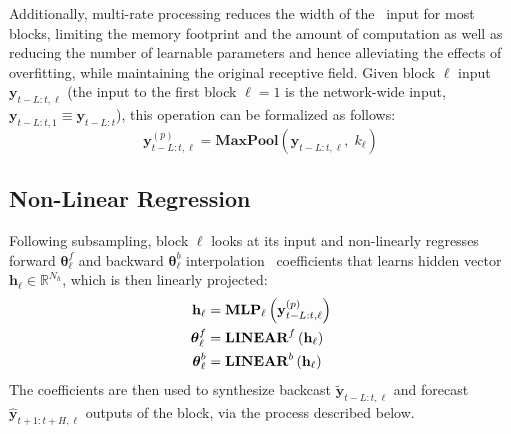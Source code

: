 
Additionally, multi-rate processing reduces the width of the \MLP\ input for most blocks, limiting the memory footprint and the amount of computation as well as  reducing the number of learnable parameters and hence alleviating the effects of overfitting, while maintaining the original receptive field. Given block $\ell$ input $\mathbf{y}_{t-L:t,\ell}$ (the input to the first block $\ell=1$ is the network-wide input, $\mathbf{y}_{t-L:t, 1} \equiv \mathbf{y}_{t-L:t}$), this operation can be formalized as follows:
\begin{equation} \label{equation:nhits_mixed_datasampling}
    \mathbf{y}^{(p)}_{t-L:t, \ell} = \mathbf{MaxPool}\left(\mathbf{y}_{t-L:t, \ell},\; k_{\ell}\right)
\end{equation}

\subsection{Non-Linear Regression}

Following subsampling, block $\ell$ looks at its input and non-linearly regresses forward $\mathbf{\theta}^{f}_{\ell}$ and backward $\mathbf{\theta}^{b}_{\ell}$ interpolation \MLP\ coefficients that learns hidden vector $\mathbf{h}_{\ell} \in \mathbb{R}^{N_{h}}$, which is then linearly projected:
\begin{align} \label{equation:nhits_projections}
\begin{split}
    \mathbf{h}_{\ell}  &= \mathbf{MLP}_{\ell}\left(\mathbf{y}^{(p)}_{t-L:t,\ell}\right) \\
    \boldsymbol \theta^{f}_{\ell} &= \textbf{LINEAR}^{f}\left(\mathbf{h}_{\ell}\right) \\
    \boldsymbol \theta^{b}_{\ell} &= \textbf{LINEAR}^{b}\left(\mathbf{h}_{\ell}\right)
\end{split}
\end{align}
The coefficients are then used to synthesize backcast $\mathbf{\tilde{y}}_{t-L:t,\ell}$ and forecast $\mathbf{\hat{y}}_{t+1:t+H,\ell}$ outputs of the block, via the process described below.

